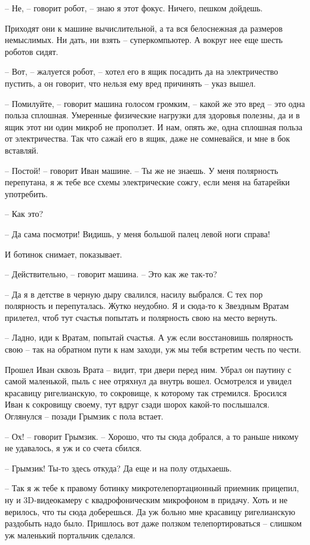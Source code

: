 \documentclass[ebook,oneside,final,openright]{memoir}
\begin{document}
– Не, – говорит робот, – знаю я этот фокус. Ничего, пешком дойдешь.\par
\par
Приходят они к машине вычислительной, а та вся белоснежная да размеров немыслимых. Ни дать, ни взять – суперкомпьютер. А вокруг нее еще шесть роботов сидят. \par
– Вот, – жалуется робот, – хотел его в ящик посадить да на электричество пустить, а он говорит, что нельзя ему вред причинять – указ вышел. \par
– Помилуйте, – говорит машина голосом громким, – какой же это вред – это одна польза сплошная. Умеренные физические нагрузки для здоровья полезны, да и в ящик этот ни один микроб не проползет. И нам, опять же, одна сплошная польза от электричества. Так что сажай его в ящик, даже не сомневайся, и мне в бок вставляй. \par
– Постой! – говорит Иван машине. – Ты же не знаешь. У меня полярность перепутана, я ж тебе все схемы электрические сожгу, если меня на батарейки употребить. \par
– Как это? \par
– Да сама посмотри! Видишь, у меня большой палец левой ноги справа! \par
И ботинок снимает, показывает. \par
– Действительно, – говорит машина. – Это как же так-то? \par
– Да я в детстве в черную дыру свалился, насилу выбрался. С тех пор полярность и перепуталась. Жутко неудобно. Я и сюда-то к Звездным Вратам прилетел, чтоб тут счастья попытать и полярность свою на место вернуть. \par
– Ладно, иди к Вратам, попытай счастья. А уж если восстановишь полярность свою – так на обратном пути к нам заходи, уж мы тебя встретим честь по чести.\par
\par
Прошел Иван сквозь Врата – видит, три двери перед ним. Убрал он паутину с самой маленькой, пыль с нее отряхнул да внутрь вошел. Осмотрелся и увидел красавицу ригелианскую, то сокровище, к которому так стремился. Бросился Иван к сокровищу своему, тут вдруг сзади шорох какой-то послышался. Оглянулся – позади Грымзик с пола встает.\par
– Ох! – говорит Грымзик. – Хорошо, что ты сюда добрался, а то раньше никому не удавалось, я уж и со счета сбился.\par
– Грымзик! Ты-то здесь откуда? Да еще и на полу отдыхаешь.\par
– Так я ж тебе к правому ботинку микротелепортационный приемник прицепил, ну и 3D-видеокамеру с квадрофоническим микрофоном в придачу. Хоть и не верилось, что ты сюда доберешься. Да уж больно мне красавицу ригелианскую раздобыть надо было. Пришлось вот даже ползком телепортироваться – слишком уж маленький портальчик сделался.\par
\end{document}
